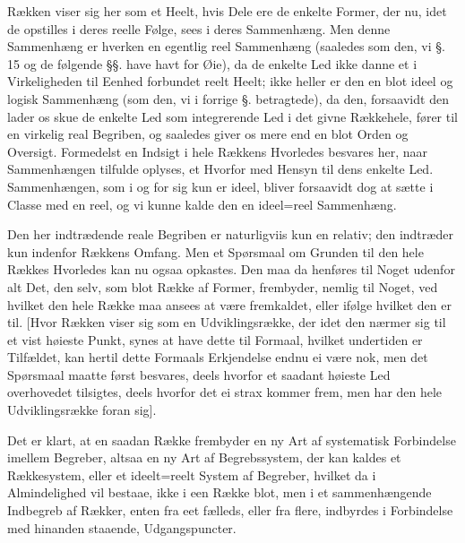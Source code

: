 \documentclass[12pt]{book}
\def\textit#1{#1}%
\def\emph#1{#1}%
\newcommand{\opage}[1]{\marginnote{\footnotesize\textit{[#1]}}}
\begin{document}
Rækken viser sig her som et Heelt, hvis Dele ere de enkelte Former, der nu, idet
de opstilles i deres reelle Følge, sees i deres Sammenhæng. Men denne Sammenhæng
er hverken en egentlig reel Sammenhæng (saaledes som den, vi §. 15 og de følgende
§§. have havt for Øie), da de enkelte Led ikke danne et i Virkeligheden til
Eenhed forbundet reelt Heelt; ikke heller er den en blot ideel og logisk
Sammenhæng (som den, vi i forrige §. betragtede), da den, forsaavidt den lader os
skue de enkelte Led som integrerende Led i det givne Rækkehele, fører til en
virkelig real Begriben, og saaledes giver os mere end en blot Orden og Oversigt.
Formedelst en Indsigt i hele Rækkens Hvorledes besvares her, naar Sammenhængen
tilfulde oplyses, et Hvorfor med Hensyn til dens enkelte Led. Sammenhængen, som i
og for sig kun er ideel, bliver forsaavidt dog at sætte i Classe med en reel, og
vi kunne kalde den \emph{en ideel=reel Sammenhæng}.

Den her indtrædende reale Begriben er naturligviis kun en relativ; den indtræder
kun indenfor Rækkens Omfang. Men et Spørsmaal om Grunden til den hele Rækkes
Hvorledes kan nu ogsaa opkastes. Den maa da henføres til
\opage{204} Noget udenfor alt Det, den selv, som blot Række af Former, frembyder, nemlig til
Noget, ved hvilket den hele Række maa ansees at være fremkaldet, eller ifølge
hvilket den er til. [Hvor Rækken viser sig som en Udviklingsrække, der idet den
nærmer sig til et vist høieste Punkt, synes at have dette til Formaal, hvilket
undertiden er Tilfældet, kan hertil dette Formaals Erkjendelse endnu ei være nok,
men det Spørsmaal maatte først besvares, deels hvorfor et saadant høieste Led
overhovedet tilsigtes, deels hvorfor det ei strax kommer frem, men har den hele
Udviklingsrække foran sig].

Det er klart, at en saadan Række frembyder en ny Art af systematisk Forbindelse
imellem Begreber, altsaa en ny Art af Begrebssystem, der kan kaldes et
\emph{Rækkesystem}, eller et \emph{ideelt=reelt} System af Begreber, hvilket da i
Almindelighed vil bestaae, ikke i een Række blot, men i et sammenhængende
Indbegreb af Rækker, enten fra eet fælleds, eller fra flere, indbyrdes i
Forbindelse med hinanden staaende, Udgangspuncter.
\end{document}
